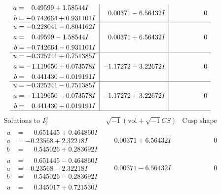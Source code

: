 \documentclass[1p]{elsarticle_modified}
\theoremstyle{definition}
\newcommand{\I}{\sqrt{-1}}
\begin{document}
$$\begin{array}{c|c|c}
\begin{aligned}
a &= \phantom{-}0.49599 + 1.58544 I \\
b &= -0.742664 + 0.931101 I\end{aligned}
 & \phantom{-}0.00371 - 6.56432 I & \phantom{-0.000000 } 0 \\ \hline\begin{aligned}
u &= -0.228041 - 0.804162 I \\
a &= \phantom{-}0.49599 - 1.58544 I \\
b &= -0.742664 - 0.931101 I\end{aligned}
 & \phantom{-}0.00371 + 6.56432 I & \phantom{-0.000000 } 0 \\ \hline\begin{aligned}
u &= -0.325241 + 0.751385 I \\
a &= -1.119650 + 0.073578 I \\
b &= \phantom{-}0.441430 - 0.019191 I\end{aligned}
 & -1.17272 - 3.22672 I & \phantom{-0.000000 } 0 \\ \hline\begin{aligned}
u &= -0.325241 - 0.751385 I \\
a &= -1.119650 - 0.073578 I \\
b &= \phantom{-}0.441430 + 0.019191 I\end{aligned}
 & -1.17272 + 3.22672 I & \phantom{-0.000000 } 0\\
 \hline 
 \end{array}$$\newpage$$\begin{array}{c|c|c}  
\text{Solutions to }I^u_{2}& \I (\text{vol} + \sqrt{-1}CS) & \text{Cusp shape}\\
 \hline 
\begin{aligned}
u &= \phantom{-}0.651445 + 0.464860 I \\
a &= -0.23568 + 2.32218 I \\
b &= \phantom{-}0.545026 + 0.283692 I\end{aligned}
 & \phantom{-}0.00371 + 6.56432 I & \phantom{-0.000000 } 0 \\ \hline\begin{aligned}
u &= \phantom{-}0.651445 - 0.464860 I \\
a &= -0.23568 - 2.32218 I \\
b &= \phantom{-}0.545026 - 0.283692 I\end{aligned}
 & \phantom{-}0.00371 - 6.56432 I & \phantom{-0.000000 } 0 \\ \hline\begin{aligned}
u &= \phantom{-}0.345017 + 0.721530 I \\

\end{aligned}
\end{array}$$
\end{document}
